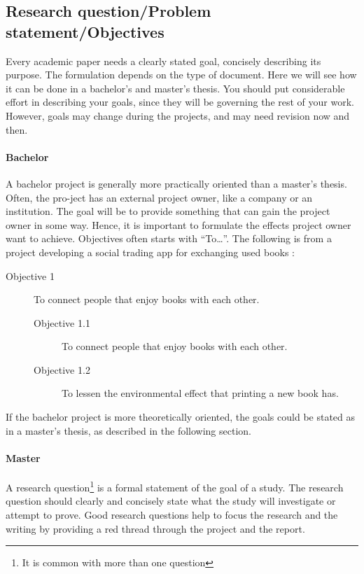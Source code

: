 \lipsum[11-14]


\subsection{Research question/Problem statement/Objectives}
\label{sec:research-question}

Every academic paper needs a clearly stated goal, concisely describing its purpose. The formulation depends on the type of document. Here we will see how it can be done in a bachelor’s and master’s thesis. You should put considerable effort in describing your goals, since they will be governing the rest of your work. However, goals may change during the projects, and may need revision now and then.

\paragraph{Bachelor}

A bachelor project is generally more practically oriented than a master’s thesis. Often, the pro-ject has an external project owner, like a company or an institution. The goal will be to provide something that can gain the project owner in some way. Hence, it is important to formulate the effects project owner want to achieve. Objectives often starts with “To\dots”.
The following is from a project developing a social trading app for exchanging used books  \cite{akeriversen20bah}:

\begin{description}
\item [Objective 1] To connect people that enjoy books with each other.
    \begin{description}
    \item [Objective 1.1] To connect people that enjoy books with each other.
    \item [Objective 1.2] To lessen the environmental effect that printing a new book has.
    \end{description}
\end{description}

If the bachelor project is more theoretically oriented, the goals could be stated as in a master’s thesis, as described in the following section.

\paragraph{Master}

A research question\footnote{It is common with more than one question} is a formal statement of the goal of a study. The research question should clearly and concisely state what the study will investigate or attempt to prove. 
Good research questions help to focus the research and the writing by providing a red thread through the project and the report. 

